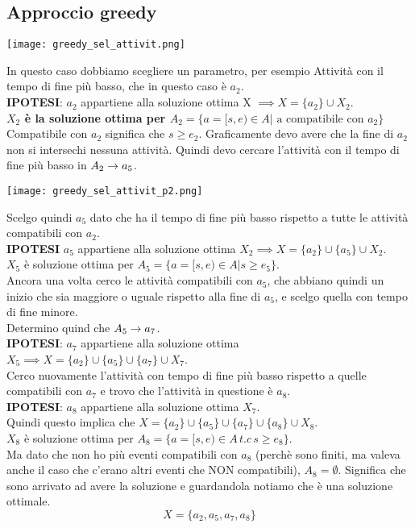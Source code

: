 \subsection{Approccio greedy}
\begin{center}
    \texttt{[image: greedy\_sel\_attivit.png]}
\end{center}
In questo caso dobbiamo scegliere un parametro, per esempio \ra Attività con il tempo
di fine più basso, che in questo caso è $a_2$.\\
\textbf{IPOTESI}: $a_2$ appartiene alla soluzione ottima X $\implies X = \{a_2\} \cup X_2$.\\
\textbf{$X_2$ è la soluzione ottima per $A_2 = \{a = [s,e) \in A | \text{ a compatibile con } a_2\}$}
Compatibile con $a_2$ significa che $s \geq e_2$. Graficamente devo avere che la fine di $a_2$ non si
intersechi nessuna attività. Quindi devo cercare l'attività con il tempo di fine più basso in $A_2 \rightarrow a_5$.
\begin{center}
    \texttt{[image: greedy\_sel\_attivit\_p2.png]}
\end{center}
Scelgo quindi $a_5$ dato che ha il tempo di fine più basso rispetto a tutte le attività 
compatibili con $a_2$.\\
\textbf{IPOTESI} $a_5$ appartiene alla soluzione ottima $X_2 \implies X = \{a_2\} \cup \{a_5\} \cup X_2$.\\
$X_5$ è soluzione ottima per $A_5 = \{a=[s,e) \in A | s \geq e_5\}$.\\
Ancora una volta cerco le attività compatibili con $a_5$, che abbiano quindi un inizio che sia maggiore
o uguale rispetto alla fine di $a_5$, e scelgo quella con tempo di fine minore.\\
Determino quind che $A_5 \rightarrow a_7$.\\
\textbf{IPOTESI}: $a_7$ appartiene alla soluzione ottima $X_5 \implies X = \{a_2\} \cup \{a_5\} \cup \{a_7\} \cup X_7$.\\
Cerco nuovamente l'attività con tempo di fine più basso rispetto a quelle compatibili con $a_7$ e trovo
che l'attività in questione è $a_8$.\\
\textbf{IPOTESI}: $a_8$ appartiene alla soluzione ottima $X_7$.\\
Quindi questo implica che $X = \{a_2\} \cup \{a_5\} \cup \{a_7\} \cup \{a_8\} \cup X_8$.\\
$X_8$ è soluzione ottima per $A_8 = \{a=[s,e) \in A\,t.c\, s \geq e_8\}$.\\
Ma dato che non ho più eventi compatibili con $a_8$ (perchè sono finiti, ma valeva anche il caso che c'erano altri
eventi che NON compatibili), $A_8 = \emptyset$. Significa che sono arrivato ad avere la soluzione
e guardandola notiamo che è una soluzione ottimale.\\
\[ X = \{a_2, a_5, a_7, a_8\} \]
